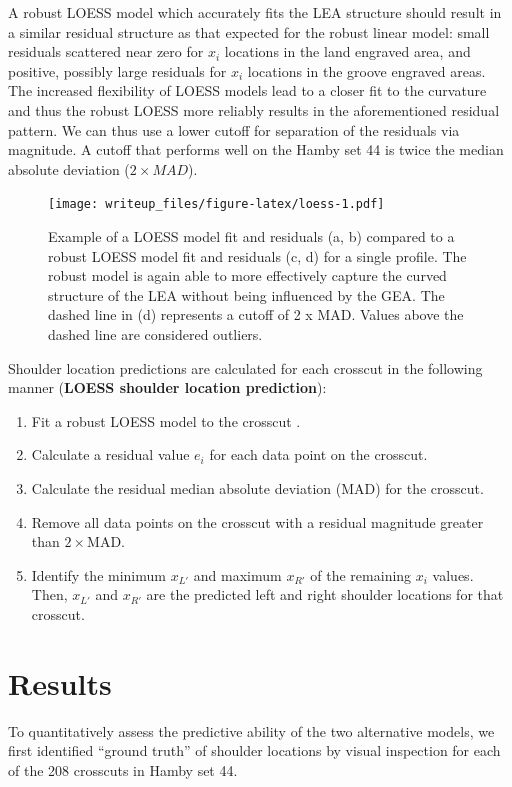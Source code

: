 \documentclass[12pt]{article}
\begin{document}
A robust LOESS model which accurately fits the LEA structure should
result in a similar residual structure as that expected for the robust
linear model: small residuals scattered near zero for \(x_i\) locations
in the land engraved area, and positive, possibly large residuals for
\(x_i\) locations in the groove engraved areas. The increased
flexibility of LOESS models lead to a closer fit to the curvature and
thus the robust LOESS more reliably results in the aforementioned
residual pattern. We can thus use a lower cutoff for separation of the
residuals via magnitude. A cutoff that performs well on the Hamby set 44
is twice the median absolute deviation (\(2 \times MAD\)).

\begin{figure}
\centering
\texttt{[image: writeup\_files/figure-latex/loess-1.pdf]}
\caption{\label{loess}Example of a LOESS model fit and residuals (a, b)
compared to a robust LOESS model fit and residuals (c, d) for a single
profile. The robust model is again able to more effectively capture the
curved structure of the LEA without being influenced by the GEA. The
dashed line in (d) represents a cutoff of 2 x MAD. Values above the
dashed line are considered outliers.}
\end{figure}

Shoulder location predictions are calculated for each crosscut in the
following manner (\textbf{LOESS shoulder location prediction}):

\begin{enumerate}
\item Fit a robust LOESS model to the crosscut \citep{locfit}.
\item Calculate a residual value $e_i$ for each data point on the crosscut.  
\item Calculate the residual median absolute deviation (MAD) for the crosscut.  
\item Remove all data points on the crosscut with a residual magnitude greater than $2 \times$MAD.  
\item Identify the minimum $x_{L'}$ and maximum $x_{R'}$ of the remaining $x_i$ values. Then, $x_{L'}$ and $x_{R'}$ are the predicted left and right shoulder locations for that crosscut.   
\end{enumerate}

\section{Results}

To quantitatively assess the predictive ability of the two alternative
models, we first identified ``ground truth'' of shoulder locations by
visual inspection for each of the 208 crosscuts in Hamby set 44.
\end{document}
